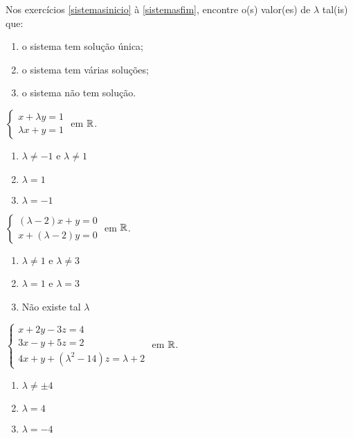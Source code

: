 \documentclass[12pt]{exam}
\begin{document}
Nos exercícios \ref{sistemasinicio} à \ref{sistemasfim}, encontre o(s) valor(es) de $\lambda$ tal(is) que:
\begin{enumerate}[label={\alph*})]
  \item o sistema tem solução única;
  \item o sistema tem várias soluções;
  \item o sistema não tem solução.
\end{enumerate}

\begin{exercicio}\label{sistemasinicio}
  $
    \begin{cases}
      x + \lambda y = 1\\
      \lambda x + y = 1
    \end{cases}
  $
  em $\mathbb{R}$.
  \begin{solucao}
    \begin{enumerate}[label={\alph*})]
      \item $\lambda \ne -1$ e $\lambda \ne 1$
      \item $\lambda = 1$
      \item $\lambda = -1$
    \end{enumerate}
  \end{solucao}
\end{exercicio}

\begin{exercicio}
  $
    \begin{cases}
      (\lambda - 2)x + y = 0\\
      x + (\lambda - 2)y = 0
    \end{cases}
  $
  em $\mathbb{R}$.
  \begin{solucao}
    \begin{enumerate}[label={\alph*})]
      \item $\lambda \ne 1$ e $\lambda \ne 3$
      \item $\lambda = 1$ e $\lambda = 3$
      \item Não existe tal $\lambda$
    \end{enumerate}
  \end{solucao}
\end{exercicio}

\begin{exercicio}
  $
    \begin{cases}
      x + 2y - 3z = 4\\
      3x - y + 5z = 2\\
      4x + y + (\lambda^2 - 14)z = \lambda + 2
    \end{cases}
  $
  em $\mathbb{R}$.
  \begin{solucao}
    \begin{enumerate}[label={\alph*})]
      \item $\lambda \ne \pm 4$
      \item $\lambda = 4$
      \item $\lambda = -4$
    \end{enumerate}
  \end{solucao}
\end{exercicio}
\end{document}
